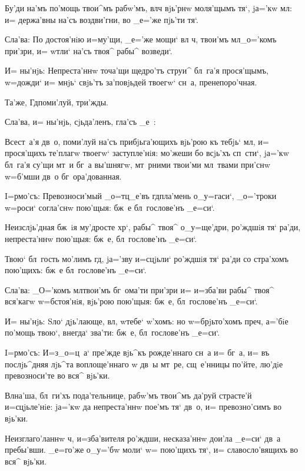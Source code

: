 Бу'ди на'мъ по'мощь твои^мъ рабw'мъ, вл ч 
вjь'рнw моля'щымъ тя`, jа='кw мл: и= держа'вны 
на'съ воздви'гни, во _е='же пjь'ти тя`.

Сла'ва: По достоя'нiю и=му'щи, _е='же мощи` вл 
ч, твои'мъ мл _о='комъ при'зри, и= w\т тли` 
на'съ твоя^ рабы^ возведи`.

И= ны'нjь: Непреста'ннw точа'щи щедро'тъ струи^ 
бл~га'я прося'щымъ, w=дожди` и= мнjь` свjь'тъ за'повjьдей 
твоегw` сн~а, пренепоро'чная.

Та'же, Гд поми'луй, три'жды. 

Сла'ва, и= ны'нjь, сjьда'ленъ, гла'съ _е~:

Всест~а'я дв~о, поми'луй на'съ прибjьга'ющихъ вjь'рою 
къ тебjь` мл, и= прося'щихъ те'плагw твоегw` 
заступле'нiя: мо'жеши бо всjь'хъ сп~сти`, jа='кw бл~га'я 
су'щи мт~и бг~а вы'шнягw, мт~рними твои'ми мл~твами 
при'снw w=б'мши дв~о бг~ора'дованная.


I=рмо'съ: Превозноси'мый _о=тц_е'въ гд пла'мень 
о_у=гаси`, _о='троки w=роси` согла'снw пою'щыя: бж~е 
бл~гослове'нъ _е=си`.

Неизслjь'дная бж~iя му'дросте хр`, рабы^ твоя^ 
о_у=ще'дри, ро'ждшiя тя` ра'ди, непреста'ннw пою'щыя: 
бж~е, бл~гослове'нъ _е=си`.

Твою` бл~гость мо'лимъ гд, jа='зву и=сцjьли` 
ро'ждшiя тя` ра'ди со стра'хомъ пою'щихъ: бж~е 
бл~гослове'нъ _е=си`.

Сла'ва: _О='комъ мл твои'мъ бг~ома'ти при'зри 
и= и=зба'ви рабы^ твоя^ вся'кагw w=бстоя'нiя, вjь'рою 
пою'щыя: бж~е, бл~гослове'нъ _е=си`.

И= ны'нjь: Sло` дjь'лающе, вл, w\т тебе` 
w'хомъ: но w=брjьто'хомъ преч, а='бiе по'мощь 
твою`, внегда` зва'ти: бж~е, бл~гослове'нъ _е=си`.


I=рмо'съ: И=з\ъ _о=ц~а` пре'жде вjь^къ рожде'ннаго 
сн~а и= бг~а, и= въ послjь^дняя лjь^та воплоще'ннаго w\т 
дв~ы мт~ре, сщ~е'нницы по'йте, лю'дiе превозноси'те во 
вся^ вjь'ки.

Вл на'ша, бл~ги'хъ пода'тельнице, рабw'мъ твои^мъ 
да'руй страсте'й и=сцjьле'нiе: jа='кw да непреста'ннw 
пое'мъ тя` дв~о, и= превозно'симъ во вjь'ки.

Неизглаго'ланнw ч, и=зба'вителя ро'ждши, 
несказа'ннw дои'ла _е=си` дв~а пребы'вши. _е=го'же 
о_у='бw моли` w= пою'щихъ тя`, и= славосло'вящихъ во вся^ 
вjь'ки.

